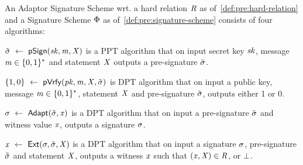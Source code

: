 \begin{definition}\label{def:pre:script:apt}
    An Adaptor Signature Scheme wrt. a hard relation $\mathit{R}$ as of~\cref{def:pre:hard-relation} and a Signature Scheme $\Phi$ as of~\cref{def:pre:signature-scheme} consists of four algorithms:
    \begin{asparaitem}
        \item $\tilde{\sigma} ~\leftarrow~ \mathsf{pSign}(\mathit{sk}, \mathit{m}, \mathit{X})$ is a PPT algorithm that on input secret key $\mathit{sk}$, message $\mathit{m} \in \{0,1\}^{*}$ and statement $\mathit{X}$ outputs a pre-signature $\tilde{\sigma}$.
        \item $\{1,0\} ~\leftarrow~ \mathsf{pVrfy}(\mathit{pk}, \mathit{m}, \mathit{X}, \tilde{\sigma})$ is DPT algorithm that on input a public key, message $\mathit{m} \in \{0,1\}^{*}$, statement $\mathit{X}$ and pre-signature $\tilde{\sigma}$, outputs either 1 or 0.
        \item $\sigma ~\leftarrow~ \mathsf{Adapt}(\tilde{\sigma}, \mathit{x})$ is a DPT algorithm that on input a pre-signature $\tilde{\sigma}$ and witness value $\mathit{x}$, outputs a signature $\sigma$.
        \item $\mathit{x} ~\leftarrow~ \mathsf{Ext}(\sigma, \tilde{\sigma}, \mathit{X})$ is a DPT algorithm that on input a signature $\sigma$, pre-signature $\tilde{\sigma}$ and statement $\mathit{X}$, outputs a witness $\mathit{x}$ such that $(\mathit{x}, \mathit{X}) \in \mathit{R}$, or $\bot$.
    \end{asparaitem}
\end{definition}

